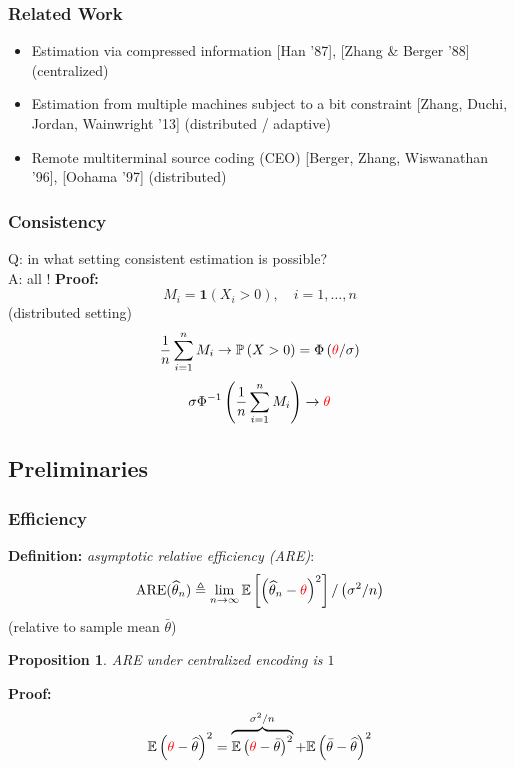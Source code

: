 \documentclass[mathserif]{beamer}
\newcommand{\thetac}{{\color{red} \theta}}
\newtheorem{prop}{Proposition}
\newcommand{\Prob}{\mathbb{P}}
\begin{document}
\begin{frame}
\frametitle{Related Work}
\begin{itemize} 
\pause
\item Estimation via compressed information [Han '87], [Zhang \& Berger '88] (centralized)
\pause
\item Estimation from multiple machines subject to a bit constraint [Zhang, Duchi, Jordan, Wainwright '13] (distributed / adaptive)
\pause
\item Remote multiterminal source coding (CEO) [Berger, Zhang, Wiswanathan '96], [Oohama '97] (distributed)
\end{itemize}
\end{frame}

\begin{frame}
\frametitle{Consistency}
Q: in what setting consistent estimation is possible? \\
\bigskip
\pause
A: all ! 
\pause
\bigskip
\textbf{Proof:}
\[
M_i = \mathbf 1(X_i>0),\quad i=1,\ldots,n
\]
(distributed setting)
\pause
\[
\frac{1}{n}\sum_{i=1}^n M_i \rightarrow \Prob\left(X>0 \right) = \Phi\left(\thetac / \sigma \right)
\]
\pause
\[
\sigma \Phi^{-1}\left( \frac{1}{n}\sum_{i=1}^n M_i  \right) \rightarrow \thetac
\]
\end{frame}


\subsection{Preliminaries}

\begin{frame}
\frametitle{Efficiency}
\textbf{Definition:} \emph{asymptotic relative efficiency (ARE)}:
\[
\mathrm{ARE}(\widehat{\theta}_n) \triangleq \lim_{n\rightarrow \infty} \mathbb E \left[ \left(\widehat{\theta}_n-\thetac \right)^2 \right] / \left(\sigma^2 / n \right)
\]
(relative to sample mean $\bar{\theta}$)
\bigskip

\pause
\begin{prop} ARE under centralized encoding is $1$
\end{prop}
\pause
\textbf{Proof:}
\[
\mathbb E \left( \thetac- \widehat{\theta} \right)^2 = \overbrace{\mathbb E \left( \thetac- \bar{\theta} \right)^2}^{\sigma^2/n} + \mathbb E \left( \bar{\theta}- \widehat{\theta} \right)^2
\]
\end{frame}
\end{document}
